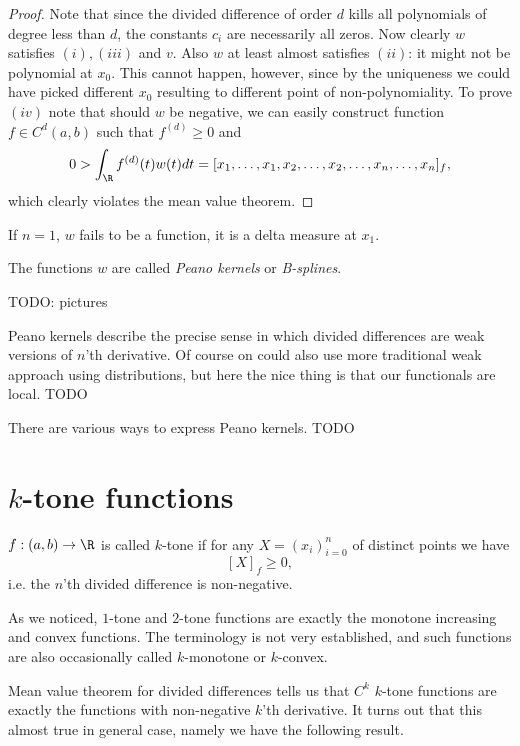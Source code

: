 \begin{lause}
\begin{proof}
		Note that since the divided difference of order $d$ kills all polynomials of degree less than $d$, the constants $c_{i}$ are necessarily all zeros. Now clearly $w$ satisfies $(i), (iii)$ and $v$. Also $w$ at least almost satisfies $(ii)$: it might not be polynomial at $x_{0}$. This cannot happen, however, since by the uniqueness we could have picked different $x_{0}$ resulting to different point of non-polynomiality. To prove $(iv)$ note that should $w$ be negative, we can easily construct  function $f \in C^{d}(a, b)$ such that $f^{(d)} \geq 0$ and
		\begin{align*}
			0 > \int_{\R} f^{(d)}(t) w(t) dt = [x_{1}, \ldots, x_{1}, x_{2}, \ldots, x_{2}, \ldots, x_{n}, \ldots, x_{n}]_{f},
		\end{align*}
		which clearly violates the mean value theorem.
	\end{proof}
\end{lause}
If $n = 1$, $w$ fails to be a function, it is a delta measure at $x_{1}$.

The functions $w$ are called \textit{Peano kernels} or \textit{B-splines}.

TODO: pictures

Peano kernels describe the precise sense in which divided differences are weak versions of $n$'th derivative. Of course on could also use more traditional weak approach using distributions, but here the nice thing is that our functionals are local. TODO

There are various ways to express Peano kernels. TODO

\section{$k$-tone functions}

\begin{maar}
	$f : (a, b) \to \R$ is called $k$-tone if for any $X = (x_{i})_{i = 0}^{n}$ of distinct points we have
	\[
		[X]_{f} \geq 0,
	\]
	i.e. the $n$'th divided difference is non-negative.
\end{maar}

As we noticed, $1$-tone and $2$-tone functions are exactly the monotone increasing and convex functions. The terminology is not very established, and such functions are also occasionally called $k$-monotone or $k$-convex.

Mean value theorem for divided differences tells us that $C^{k}$ $k$-tone functions are exactly the functions with non-negative $k$'th derivative. It turns out that this almost true in general case, namely we have the following result.

